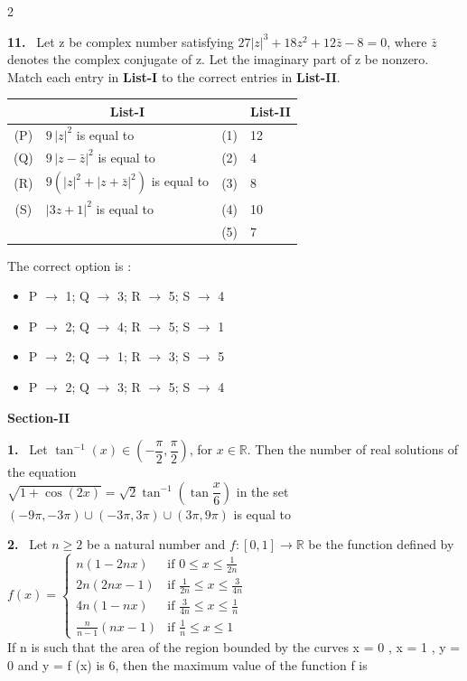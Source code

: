 \documentclass[10pt]{extarticle}
\newcommand{\sect}[1]{\par\smallskip\noindent\textbf{#1}\par}
\newcommand{\qn}[1]{\par\smallskip\noindent\textbf{#1.}~}
\newenvironment{qoptions}{\begin{itemize}[leftmargin=1.8em,itemsep=1pt,topsep=2pt,label={}]}{\end{itemize}}
\newcommand{\opt}[2]{\item[(#1)] #2}
\begin{document}
\begin{multicols}{2}
\qn{11} Let z be complex number satisfying $27|z|^3+18z^2+12\bar z-8=0$, where $\bar z$ denotes the complex conjugate of z. Let the imaginary part of z be nonzero.\\
Match each entry in \textbf{List-I} to the correct entries in \textbf{List-II}.\par\nobreak
\begin{center}\small\setlength{\tabcolsep}{3pt}
\begin{tabular}{|c|p{3.0cm}|c|p{0.8cm}|}
\hline
 & \multicolumn{1}{c|}{\textbf{List-I}} & & \multicolumn{1}{c|}{\textbf{\footnotesize List-II}} \\
\hline
(P) & $9\,|z|^2$ is equal to & (1) & 12 \\
\hline
(Q) & $9\,|z-\bar z|^2$ is equal to & (2) & 4 \\
\hline
(R) & $9\left(|z|^2+|z+\bar z|^2\right)$ is equal to & (3) & 8 \\
\hline
(S) & $|3z+1|^2$ is equal to & (4) & 10 \\
\hline
 & & (5) & 7 \\
\hline
\end{tabular}
\end{center}
The correct option is :
\begin{qoptions}
\opt{A}{P $\to$ 1; Q $\to$ 3; R $\to$ 5; S $\to$ 4}
\opt{B}{P $\to$ 2; Q $\to$ 4; R $\to$ 5; S $\to$ 1}
\opt{C}{P $\to$ 2; Q $\to$ 1; R $\to$ 3; S $\to$ 5}
\opt{D}{P $\to$ 2; Q $\to$ 3; R $\to$ 5; S $\to$ 4}
\end{qoptions}

\sect{Section-II}

\qn{1} Let $\tan^{-1}(x)\in\left(-\dfrac\pi2,\dfrac\pi2\right)$, for $x\in\mathbb R$. Then the number of real solutions of the equation\\
$\sqrt{1+\cos(2x)}=\sqrt2\tan^{-1}\left(\tan\dfrac x6\right)$ in the set $(-9\pi,-3\pi)\cup(-3\pi,3\pi)\cup(3\pi,9\pi)$ is equal to

\qn{2} Let $n\geq2$ be a natural number and $f:[0,1]\to\mathbb R$ be the function defined by\\
$f(x)=\begin{cases}n(1-2nx)&\text{if }0\leqslant x\leqslant\frac1{2n}\\ 2n(2nx-1)&\text{if }\frac1{2n}\leqslant x\leqslant\frac3{4n}\\ 4n(1-nx)&\text{if }\frac3{4n}\leqslant x\leqslant\frac1n\\ \frac n{n-1}(nx-1)&\text{if }\frac1n\leqslant x\leqslant1\end{cases}$\\
If n is such that the area of the region bounded by the curves x = 0 , x = 1 , y = 0 and y = f (x) is 6, then the maximum value of the function f is


\end{multicols}
\end{document}
